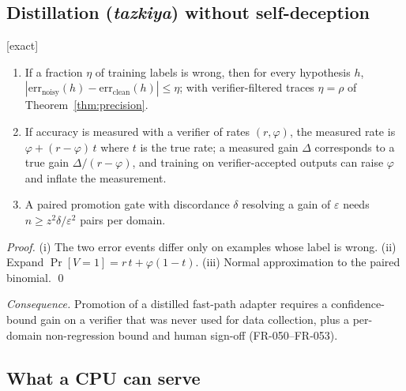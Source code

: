\subsection{Distillation (\emph{tazkiya}) without self-deception}

\begin{proposition} \textnormal{[exact]}
\label{prop:distill}
\begin{enumerate}[label=(\roman*)]
\item If a fraction $\eta$ of training labels is wrong, then for every
hypothesis $h$, $|\mathrm{err}_{\text{noisy}}(h)-\mathrm{err}_{\text{clean}}(h)|\le\eta$;
with verifier-filtered traces $\eta=\rho$ of Theorem~\ref{thm:precision}.
\item If accuracy is measured with a verifier of rates $(r,\varphi)$, the
measured rate is $\varphi+(r-\varphi)\,t$ where $t$ is the true rate; a measured
gain $\Delta$ corresponds to a true gain $\Delta/(r-\varphi)$, and training on
verifier-accepted outputs can raise $\varphi$ and inflate the measurement.
\item A paired promotion gate with discordance $\delta$ resolving a gain of
$\varepsilon$ needs $n\ge z^2\delta/\varepsilon^2$ pairs per domain.
\end{enumerate}
\end{proposition}
\begin{proof}
(i) The two error events differ only on examples whose label is wrong.
(ii) Expand $\Pr[V=1]=r\,t+\varphi(1-t)$. (iii) Normal approximation to the
paired binomial. \qed
\end{proof}
\emph{Consequence.} Promotion of a distilled fast-path adapter requires a
confidence-bound gain on a verifier that was never used for data collection,
plus a per-domain non-regression bound and human sign-off (FR-050--FR-053).

\subsection{What a CPU can serve}

